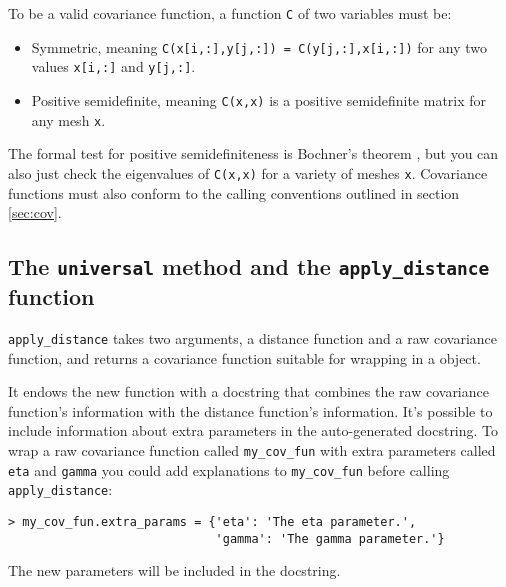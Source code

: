 \documentclass{manual}
\begin{document}
To be a valid covariance function, a function \texttt{C} of two variables must be:
\begin{itemize}
    \item Symmetric, meaning \texttt{C(x[i,:],y[j,:]) = C(y[j,:],x[i,:])} for any two values \texttt{x[i,:]} and \texttt{y[j,:]}.
    \item Positive semidefinite, meaning \texttt{C(x,x)} is a positive semidefinite matrix for any mesh \texttt{x}.
\end{itemize}
The formal test for positive semidefiniteness is Bochner's theorem \cite{stein}, but you can also just check the eigenvalues of \texttt{C(x,x)} for a variety of meshes \texttt{x}. Covariance functions must also conform to the calling conventions outlined in section \ref{sec:cov}. 

\subsection{The \texttt{universal} method and the \texttt{apply_distance} function}\label{sub:universal}
\texttt{apply_distance} takes two arguments, a distance function and a raw covariance function, and returns a covariance function suitable for wrapping in a  object. 

It endows the new function with a docstring that combines the raw covariance function's information with the distance function's information. It's possible to include information about extra parameters in the auto-generated docstring. To wrap a raw covariance function called \texttt{my_cov_fun} with extra parameters called \texttt{eta} and \texttt{gamma} you could add explanations to \texttt{my_cov_fun} before calling \texttt{apply_distance}:
\begin{verbatim}
> my_cov_fun.extra_params = {'eta': 'The eta parameter.', 
                             'gamma': 'The gamma parameter.'}
\end{verbatim}
The new parameters will be included in the docstring.
\end{document}
